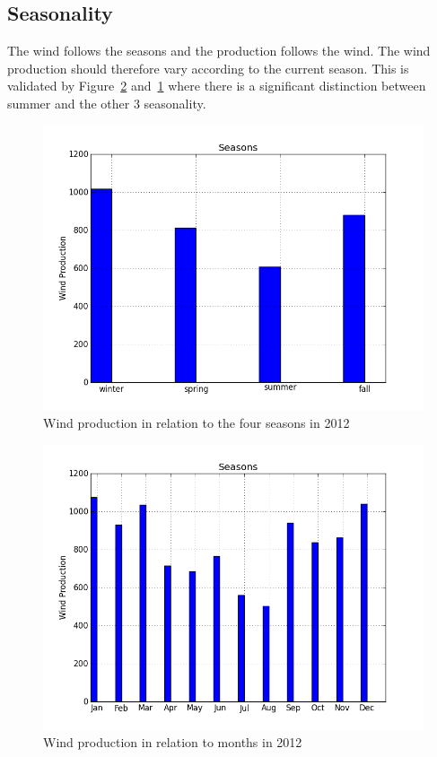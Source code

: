\subsection{Seasonality}
\label{sec:windProdSeasonality}
The wind follows the seasons and the production follows the wind. The wind production should therefore vary according to the current season. This is validated by Figure~\ref{fig:windProductionMonths} and~\ref{fig:windProductionSeasons} where there is a significant distinction between summer and the other 3 seasonality.

\begin{figure}[H]
\centering
\includegraphics[width=0.99\linewidth,natwidth=898,natheight=587]{billeder/Seasons/windProdctionSeasons.png}
\caption{Wind production in relation to the four seasons in 2012}
\label{fig:windProductionSeasons}
\end{figure}

\begin{figure}[H]
\centering
\includegraphics[width=0.99\linewidth,natwidth=898,natheight=587]{billeder/Seasons/windProductionMonths.png}
\caption{Wind production in relation to months in 2012}
\label{fig:windProductionMonths}
\end{figure}

